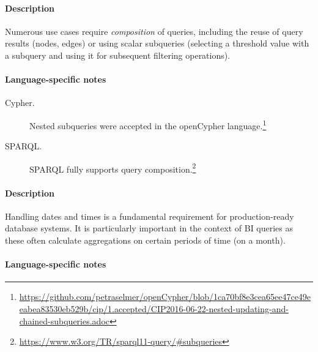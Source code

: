 



\paragraph{Description}

Numerous use cases require \emph{composition} of queries, including the reuse of
query results (\eg nodes, edges) or using scalar subqueries (\eg selecting a
threshold value with a subquery and using it for subsequent filtering
operations).

\paragraph{Language-specific notes}

\begin{description}
\item[Cypher.] Nested subqueries were accepted in the openCypher language.\footnote{\url{https://github.com/petraselmer/openCypher/blob/1ca70bf8e3cea65ee47ce49eeabea83530eb529b/cip/1.accepted/CIP2016-06-22-nested-updating-and-chained-subqueries.adoc}}
\item[SPARQL.] SPARQL fully supports query composition.\footnote{\url{https://www.w3.org/TR/sparql11-query/\#subqueries}}
\end{description}





\paragraph{Description}

Handling dates and times is a fundamental requirement for production-ready
database systems. It is particularly important in the context of BI queries as
these often calculate aggregations on certain periods of time (\eg on a month).

\paragraph{Language-specific notes}

